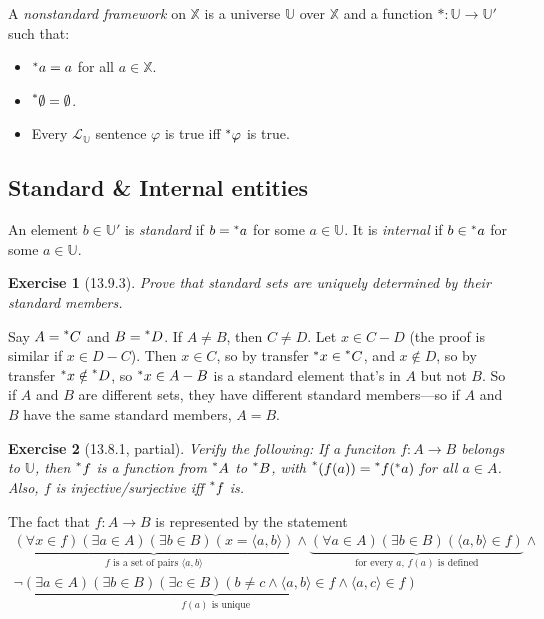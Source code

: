 \documentclass{article}
\newcommand{\hr}[1]{\prescript{*}{}{#1}}
\newtheorem*{exercise}{Exercise}
\begin{document}
A \textit{nonstandard framework} on $\mathbb{X}$ is a universe $\mathbb{U}$ over $\mathbb{X}$ and a function $\ast : \mathbb{U} \to \mathbb{U}'$ such that: \begin{itemize}
\item $\hr{a} = a$ for all $a \in \mathbb{X}$.
\item $\hr{\emptyset} = \emptyset$.
\item Every $\mathcal{L}_\mathbb{U}$ sentence $\varphi$ is true iff $\hr{\varphi}$ is true.
\end{itemize}

\subsection{Standard \& Internal entities}
An element $b \in \mathbb{U}'$ is \textit{standard} if $b = \hr{a}$ for some $a \in \mathbb{U}$. It is \textit{internal} if $b \in \hr{a}$ for some $a \in \mathbb{U}$.

\begin{exercise}[13.9.3]
    Prove that standard sets are uniquely determined by their standard members.
\end{exercise}

Say $A = \hr{C}$ and $B = \hr{D}$. If $A \neq B$, then $C \neq D$. Let $x \in C - D$ (the proof is similar if $x \in D - C$). Then $x \in C$, so by transfer $\hr{x} \in \hr{C}$, and $x \notin D$, so by transfer $\hr{x} \notin \hr{D}$, so $\hr{x} \in A - B$ is a standard element that's in $A$ but not $B$. So if $A$ and $B$ are different sets, they have different standard members---so if $A$ and $B$ have the same standard members, $A = B$.

\begin{exercise}[13.8.1, partial]
    Verify the following: If a funciton $f: A \to B$ belongs to $\mathbb{U}$, then $\hr{f}$ is a function from $\hr{A}$ to $\hr{B}$, with $\hr{(f(a))} = \hr{f}(\hr{a})$ for all $a \in A$. Also, $f$ is injective/surjective iff $\hr{f}$ is.
\end{exercise}

The fact that $f: A \to B$ is represented by the statement 
\begin{multline*}
    \underbrace{(\forall x \in f)(\exists a \in A)(\exists b \in B)(x = \langle a, b \rangle)}_{\text{$f$ is a set of pairs $\langle a, b\rangle$}} \land
    \underbrace{(\forall a \in A)(\exists b \in B)(\langle a, b\rangle \in f)}_{\text{for every $a$, $f(a)$ is defined}} \land \\ 
    \underbrace{\neg(\exists a \in A)(\exists b \in B)(\exists c \in B)(b \neq c \land \langle a, b \rangle \in f \land \langle a, c \rangle \in f)}_{\text{$f(a)$ is unique}}
\end{multline*}
\end{document}
